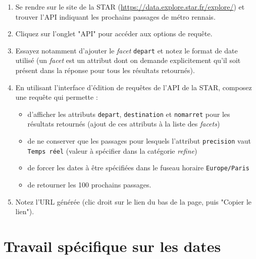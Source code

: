 \documentclass[11pt,a4paper]{article}
\begin{document}
\begin{enumerate}
    \item Se rendre sur le site de la STAR (\url{https://data.explore.star.fr/explore/})
            et trouver l'API indiquant les prochains passages de métro rennais.
    \item Cliquez sur l'onglet "API" pour accéder aux options de requête.
    \item Essayez notamment d'ajouter le \emph{facet} \verb+depart+ et notez le format de date
            utilisé (un \emph{facet} est un attribut dont on demande explicitement qu'il soit 
            présent dans la réponse pour tous les résultats retournés).
    \item En utilisant l'interface d'édition de requêtes de l'API de la STAR, composez une requête qui permette :
    \begin{itemize}
        \item d'afficher les attributs \verb+depart+, \verb+destination+ et \verb+nomarret+ pour les résultats 
            retournés (ajout de ces attributs à la liste des \emph{facets})
        \item de ne conserver que les passages pour lesquels l'attribut \verb+precision+ vaut 
        \verb+Temps réel+ (valeur à spécifier dans la catégorie \emph{refine})
        \item de forcer les dates à être spécifiées dans le fuseau horaire \verb+Europe/Paris+
        \item de retourner les 100 prochains passages.
    \end{itemize}
    \item Notez l'URL générée (clic droit sur le lien du bas de la page, puis "Copier le lien").
\end{enumerate}

\section{Travail spécifique sur les dates}
\end{document}
